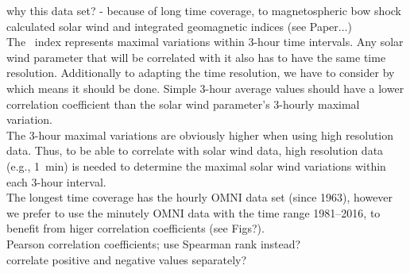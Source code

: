 why this data set? - because of long time coverage, to magnetospheric bow shock calculated solar wind and integrated geomagnetic indices (see Paper...)\\

The \Kp{}~index represents maximal variations within 3-hour time intervals. Any solar wind parameter that will be correlated with it also has to have the same time resolution. Additionally to adapting the time resolution, we have to consider by which means it should be done. Simple 3-hour average values should have a lower correlation coefficient than the solar wind parameter's 3-hourly maximal variation.\\

The 3-hour maximal variations are obviously higher when using high resolution data. Thus, to be able to correlate \Kp{} with solar wind data, high resolution data (e.g., 1~min) is needed to determine the maximal solar wind variations within each 3-hour interval.\\

The longest time coverage has the hourly OMNI data set (since 1963), however we prefer to use the minutely OMNI data with the time range 1981--2016, to benefit from higer correlation coefficients (see Figs?).\\


Pearson correlation coefficients; use Spearman rank instead?\\
correlate positive and negative values separately?\\

